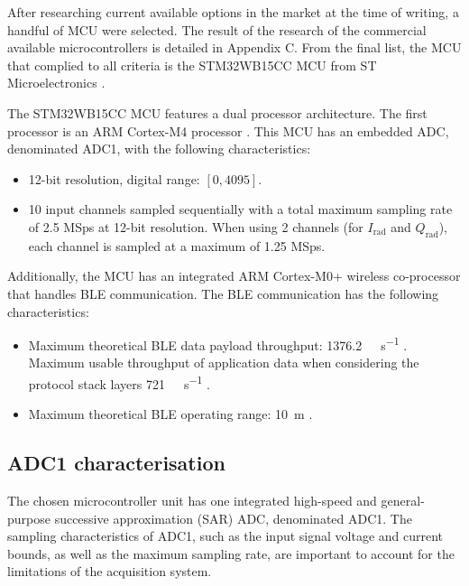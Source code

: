 After researching current available options in the market at the time of writing, a handful of MCU were selected. The result of the research of the commercial available microcontrollers is detailed in Appendix C. %
From the final list, the MCU that complied to all criteria is the STM32WB15CC MCU from ST Microelectronics \cite{STMicroelectronics2022}.

The STM32WB15CC MCU features a dual processor architecture. The first processor is an ARM Cortex-M4 processor \cite{STMicroelectronics2022}. This MCU has an embedded ADC, denominated ADC1, with the following characteristics:
\begin{itemize}
	\item 12-bit resolution, digital range: $[0, 4095]$.
	\item 10 input channels sampled sequentially with a total maximum sampling rate of 2.5 MSps at 12-bit resolution. When using 2 channels (for $I_\mathrm{rad}$ and $Q_\mathrm{rad}$), each channel is sampled at a maximum of 1.25 MSps.
\end{itemize}

Additionally, the MCU has an integrated ARM Cortex-M0+ wireless co-processor that handles BLE communication. The BLE communication has the following characteristics:
\begin{itemize}
	\item Maximum theoretical BLE data payload throughput: \SI{1376.2}{\kilo\bit\per\second} \cite{NordicSemiconductor2019,Bluetooth52}. Maximum usable throughput of application data when considering the protocol stack layers \SI{721}{\kilo\bit\per\second} \cite{STMicroelectronics2022b}.
	\item Maximum theoretical BLE operating range: \SI{10}{\meter} \cite{Bluetooth52}.
\end{itemize}

\subsection{ADC1 characterisation}\label{sec:adc1-characterisation}

The chosen microcontroller unit has one integrated high-speed and general-purpose successive approximation (SAR) ADC, denominated ADC1. The sampling characteristics of ADC1, such as the input signal voltage and current bounds, as well as the maximum sampling rate, are important to account for the limitations of the acquisition system.

